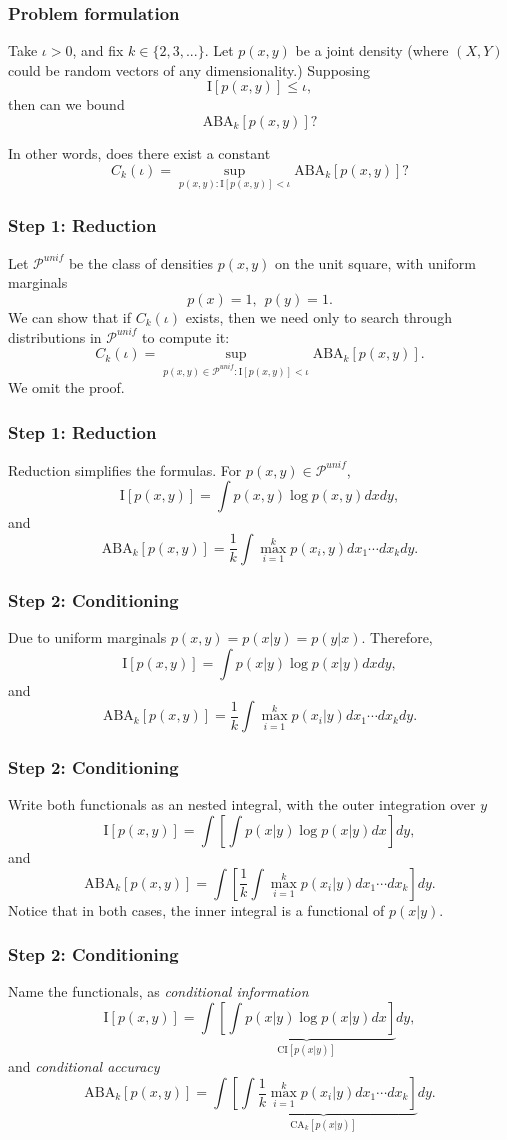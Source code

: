 \documentclass{beamer}
\begin{document}
\begin{frame}
\frametitle{Problem formulation} Take $\iota > 0$, and fix $k \in
\{2,3,...\}$.  Let $p(x, y)$ be a joint density (where $(X, Y)$
could be random vectors of any dimensionality.)  Supposing
\[
\text{I}[p(x, y)] \leq \iota,
\]
then can we bound
\[
\text{ABA}_k[p(x, y)]?
\]

In other words, does there exist a constant
\[
C_k(\iota) = \sup_{p(x, y): \text{I}[p(x, y)] < \iota} \text{ABA}_k[p(x, y)]?
\]
\end{frame}

\begin{frame}
\frametitle{Step 1: Reduction}
Let $\mathcal{P}^{unif}$ be the class of densities $p(x, y)$ on the unit square, with uniform marginals
\[
p(x) = 1,\ \ p(y) = 1.
\]
We can show that if $C_k(\iota)$ exists, then we need only to search through distributions in $\mathcal{P}^{unif}$ to compute it:
\[
C_k(\iota) = \sup_{p(x, y) \in \mathcal{P}^{unif}: \text{I}[p(x, y)] < \iota} \text{ABA}_k[p(x, y)].
\]
We omit the proof.
\end{frame}

\begin{frame}
\frametitle{Step 1: Reduction}
Reduction simplifies the formulas.  For $p(x, y) \in \mathcal{P}^{unif}$,
\[
\text{I}[p(x, y)] = \int p(x, y) \log p(x, y) dx dy,
\]
and
\[
\text{ABA}_k[p(x, y)] = \frac{1}{k}\int \max_{i=1}^k p(x_i, y) dx_1 \cdots dx_k dy.
\]
\end{frame}

\begin{frame}
\frametitle{Step 2: Conditioning}
Due to uniform marginals $p(x, y) = p(x|y) = p(y|x)$.  Therefore,
\[
\text{I}[p(x, y)] = \int p(x|y) \log p(x|y) dx dy,
\]
and
\[
\text{ABA}_k[p(x, y)] = \frac{1}{k}\int \max_{i=1}^k p(x_i|y) dx_1 \cdots dx_k dy.
\]
\end{frame}

\begin{frame}
\frametitle{Step 2: Conditioning}
Write both functionals as an nested integral, with the outer integration over $y$
\[
\text{I}[p(x, y)] = \int \left[\int p(x|y) \log p(x|y) dx\right] dy,
\]
and
\[
\text{ABA}_k[p(x, y)] =\int \left[\frac{1}{k} \int \max_{i=1}^k p(x_i|y) dx_1 \cdots dx_k\right] dy.
\]
Notice that in both cases, the inner integral is a functional of $p(x|y)$.
\end{frame}

\begin{frame}
\frametitle{Step 2: Conditioning}
Name the functionals, as \emph{conditional information}
\[
\text{I}[p(x, y)] = \int \underbrace{\left[\int p(x|y) \log p(x|y) dx\right]}_{\text{CI}[p(x|y)]} dy,
\]
and \emph{conditional accuracy}
\[
\text{ABA}_k[p(x, y)] = \int \underbrace{\left[\int\frac{1}{k} \max_{i=1}^k p(x_i|y) dx_1 \cdots dx_k\right]}_{\text{CA}_k[p(x|y)]} dy.
\]
\end{frame}
\end{document}
